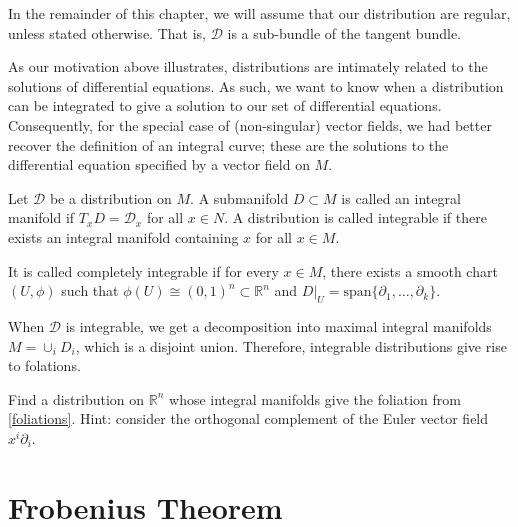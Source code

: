 \begin{remark}
  In the remainder of this chapter, we will assume that our distribution are regular, unless stated otherwise. That is, $\mathcal{D}$  is a sub-bundle of the tangent bundle.
\end{remark}
As our motivation above illustrates, distributions are intimately related to the solutions of differential equations. As such, we want to know when a distribution can be integrated to give a solution to our set of differential equations. Consequently, for the special case of (non-singular) vector fields, we had better recover the definition of an integral curve; these are the solutions to the differential equation specified by a vector field on $M$.
\begin{definition}
  Let $\mathcal{D}$ be a distribution on $M$. A submanifold $D\subset M$ is called an integral manifold if $T_xD=\mathcal{D}_x$ for all $x\in N$. A distribution is called integrable if there exists an integral manifold containing $x$ for all $x\in M$. \par
  It is called completely integrable if for every $x\in M$, there exists a smooth chart $(U,\phi)$ such that $\phi(U)\cong (0,1)^n\subset\mathbb{R}^n$ and $D|_U=\text{span}\{\partial_1,\dots,\partial_k\}$.
\end{definition}
When $\mathcal{D}$ is integrable, we get a decomposition into maximal integral manifolds $M=\cup_i D_i$, which is a disjoint union. Therefore, integrable distributions give rise to folations.
\begin{exercise}
  Find a distribution on $\mathbb{R}^n$ whose integral manifolds give the foliation from \ref{foliations}. Hint: consider the orthogonal complement of the Euler vector field $x^i\partial_i$.
\end{exercise}

\section{Frobenius Theorem}

